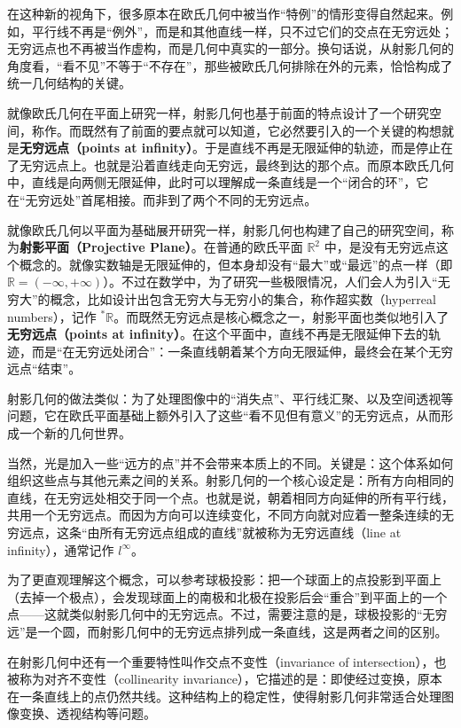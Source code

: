 在这种新的视角下，很多原本在欧氏几何中被当作“特例”的情形变得自然起来。例如，平行线不再是“例外”，而是和其他直线一样，只不过它们的交点在无穷远处；无穷远点也不再被当作虚构，而是几何中真实的一部分。换句话说，从射影几何的角度看，“看不见”不等于“不存在”，那些被欧氏几何排除在外的元素，恰恰构成了统一几何结构的关键。

就像欧氏几何在平面上研究一样，射影几何也基于前面的特点设计了一个研究空间，称作。而既然有了前面的要点就可以知道，它必然要引入的一个关键的构想就是\textbf{无穷远点（points at infinity）}。于是直线不再是无限延伸的轨迹，而是停止在了无穷远点上。也就是沿着直线走向无穷远，最终到达的那个点。而原本欧氏几何中，直线是向两侧无限延伸，此时可以理解成一条直线是一个“闭合的环”，它在“无穷远处”首尾相接。而非到了两个不同的无穷远点。

就像欧氏几何以平面为基础展开研究一样，射影几何也构建了自己的研究空间，称为\textbf{射影平面（Projective Plane）}。在普通的欧氏平面 $\mathbb{R}^2$ 中，是没有无穷远点这个概念的。就像实数轴是无限延伸的，但本身却没有“最大”或“最远”的点一样（即 $\mathbb{R} = (-\infty, +\infty)$）。不过在数学中，为了研究一些极限情况，人们会人为引入“无穷大”的概念，比如设计出包含无穷大与无穷小的集合，称作超实数（hyperreal numbers），记作 $^*\mathbb{R}$。而既然无穷远点是核心概念之一，射影平面也类似地引入了\textbf{无穷远点（points at infinity）}。在这个平面中，直线不再是无限延伸下去的轨迹，而是“在无穷远处闭合”：一条直线朝着某个方向无限延伸，最终会在某个无穷远点“结束”。



射影几何的做法类似：为了处理图像中的“消失点”、平行线汇聚、以及空间透视等问题，它在欧氏平面基础上额外引入了这些“看不见但有意义”的无穷远点，从而形成一个新的几何世界。

当然，光是加入一些“远方的点”并不会带来本质上的不同。关键是：这个体系如何组织这些点与其他元素之间的关系。射影几何的一个核心设定是：所有方向相同的直线，在无穷远处相交于同一个点。也就是说，朝着相同方向延伸的所有平行线，共用一个无穷远点。而因为方向可以连续变化，不同方向就对应着一整条连续的无穷远点，这条“由所有无穷远点组成的直线”就被称为无穷远直线（line at infinity），通常记作 $l^\infty$。

为了更直观理解这个概念，可以参考球极投影：把一个球面上的点投影到平面上（去掉一个极点），会发现球面上的南极和北极在投影后会“重合”到平面上的一个点——这就类似射影几何中的无穷远点。不过，需要注意的是，球极投影的“无穷远”是一个圆，而射影几何中的无穷远点排列成一条直线，这是两者之间的区别。

在射影几何中还有一个重要特性叫作交点不变性（invariance of intersection），也被称为对齐不变性（collinearity invariance），它描述的是：即使经过变换，原本在一条直线上的点仍然共线。这种结构上的稳定性，使得射影几何非常适合处理图像变换、透视结构等问题。

